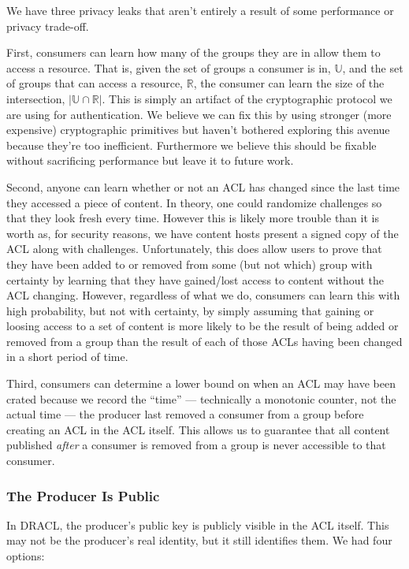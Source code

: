 \documentclass[pdftex,12pt,a4papaer,twoside,notitlepage]{report}
\begin{document}
We have three privacy leaks that aren't entirely a result of some performance or
privacy trade-off.

First, consumers can learn how many of the groups they are in allow them to
access a resource. That is, given the set of groups a consumer is in,
$\mathbb{U}$, and the set of groups that can access a resource, $\mathbb{R}$,
the consumer can learn the size of the intersection, $|\mathbb{U} \cap
\mathbb{R}|$. This is simply an artifact of the cryptographic protocol we are
using for authentication. We believe we can fix this by using stronger (more
expensive) cryptographic primitives but haven't bothered exploring this avenue
because they're too inefficient. Furthermore we believe this should be fixable
without sacrificing performance but leave it to future work.

Second, anyone can learn whether or not an ACL has changed since the last time
they accessed a piece of content. In theory, one could randomize challenges so
that they look fresh every time. However this is likely more trouble than it is
worth as, for security reasons, we have content hosts present a signed copy of
the ACL along with challenges. Unfortunately, this does allow users to prove
that they have been added to or removed from some (but not which) group with
certainty by learning that they have gained/lost access to content without the
ACL changing. However, regardless of what we do, consumers can learn this with
high probability, but not with certainty, by simply assuming that gaining or
loosing access to a set of content is more likely to be the result of being
added or removed from a group than the result of each of those ACLs having been
changed in a short period of time.

Third, consumers can determine a lower bound on when an ACL may have been crated
because we record the ``time'' --- technically a monotonic counter, not the
actual time --- the producer last removed a consumer from a group before creating
an ACL in the ACL itself. This allows us to guarantee that all content published
\emph{after} a consumer is removed from a group is never accessible to that
consumer.

\subsubsection{The Producer Is Public}
\label{sec:producer_public}

In DRACL, the producer's public key is publicly visible in the ACL itself. This
may not be the producer's real identity, but it still identifies them. We had
four options:
\end{document}
